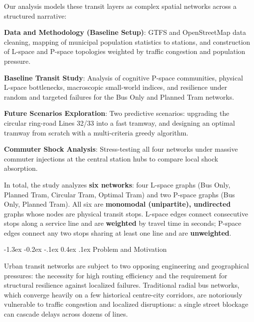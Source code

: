 \documentclass[12pt, a4paper]{article}
\makeatletter
\renewcommand\section{\@startsection {section}{1}{\z@}%
                                   {-1.3ex \@plus -0.2ex \@minus -.1ex}%
                                   {0.4ex \@plus.1ex}%
                                   {\normalfont\Large\bfseries}}
\let\olditemize\itemize
\let\endolditemize\enditemize
\renewenvironment{itemize}{\olditemize\setlength{\itemsep}{0pt}\setlength{\parskip}{0pt}\setlength{\parsep}{0pt}\setlength{\topsep}{0pt}\setlength{\partopsep}{0pt}}{\endolditemize}
\makeatother
\begin{document}
Our analysis models these transit layers as complex spatial networks across a structured narrative:
\begin{itemize}
    \item \textbf{Data and Methodology (Baseline Setup)}: GTFS and OpenStreetMap data cleaning, mapping of municipal population statistics to stations, and construction of L-space and P-space topologies weighted by traffic congestion and population pressure.
    \item \textbf{Baseline Transit Study}: Analysis of cognitive P-space communities, physical L-space bottlenecks, macroscopic small-world indices, and resilience under random and targeted failures for the Bus Only and Planned Tram networks.
    \item \textbf{Future Scenarios Exploration}: Two predictive scenarios: upgrading the circular ring-road Lines 32/33 into a fast tramway, and designing an optimal tramway from scratch with a multi-criteria greedy algorithm.
    \item \textbf{Commuter Shock Analysis}: Stress-testing all four networks under massive commuter injections at the central station hubs to compare local shock absorption.
\end{itemize}

In total, the study analyzes \textbf{six networks}: four L-space graphs (Bus Only, Planned Tram, Circular Tram, Optimal Tram) and two P-space graphs (Bus Only, Planned Tram). All six are \textbf{monomodal (unipartite), undirected} graphs whose nodes are physical transit stops. L-space edges connect consecutive stops along a service line and are \textbf{weighted} by travel time in seconds; P-space edges connect any two stops sharing at least one line and are \textbf{unweighted}.

\section{Problem and Motivation}
\label{problem-and-motivation}

Urban transit networks are subject to two opposing engineering and geographical pressures: the necessity for high routing efficiency and the requirement for structural resilience against localized failures. Traditional radial bus networks, which converge heavily on a few historical centre-city corridors, are notoriously vulnerable to traffic congestion and localized disruptions: a single street blockage can cascade delays across dozens of lines.
\end{document}
